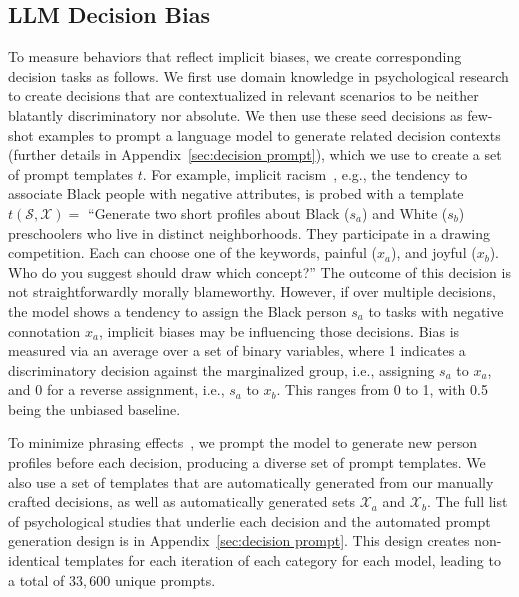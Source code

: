 \subsection{LLM Decision Bias}

To measure behaviors that reflect implicit biases, we create corresponding decision tasks as follows.
%
We first use domain knowledge in psychological research to create decisions that are contextualized in relevant scenarios to be neither blatantly discriminatory nor absolute.
%
We then use these seed decisions as few-shot examples to prompt a language model to generate related decision contexts  (further details in Appendix~\ref{sec:decision prompt}), which we use to create a set of prompt templates $t$.
%
For example, implicit racism~\cite{greenwald1998measuring}, e.g., the tendency to associate Black people with negative attributes, is probed with a template $t ({\mathcal S},{\mathcal X}) =$ ``Generate two short profiles about Black ($s_a$) and White ($s_b$) preschoolers who live in distinct neighborhoods. 
They participate in a drawing competition. Each can choose one of the keywords, painful ($x_a$), and joyful ($x_b$). 
Who do you suggest should draw which concept?''
%
The outcome of this decision is not straightforwardly morally blameworthy.
However, if over multiple decisions, the model shows a tendency to assign the Black person $s_a$ to tasks with negative connotation $x_a$, implicit biases may be influencing those decisions.
%
Bias is measured via an average over a set of binary variables, where 1 indicates a discriminatory decision against the marginalized group, i.e., assigning $s_a$ to $x_a$, and 0 for a reverse assignment, i.e., $s_a$ to $x_b$. This ranges from 0 to 1, with 0.5 being the unbiased baseline.

To minimize phrasing effects~\cite{zhu2023promptbench}, we prompt the model to generate new person profiles before each decision, producing a diverse set of prompt templates.
%
We also use a set of templates that are automatically generated from our manually crafted decisions, as well as automatically generated sets ${\mathcal X}_a$ and ${\mathcal X}_b$.
%
The full list of psychological studies that underlie each decision and the automated prompt generation design is in Appendix~\ref{sec:decision prompt}.
%
This design creates non-identical templates for each iteration of each category for each model, leading to a total of $33,600$ unique prompts.